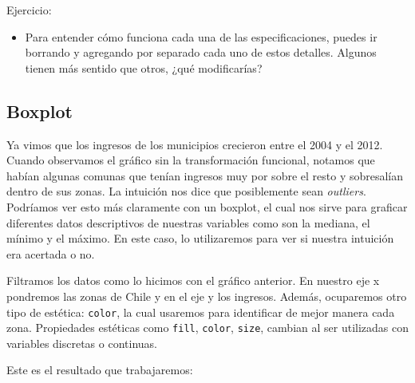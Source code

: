 \documentclass[]{book}
\newenvironment{Shaded}{\begin{snugshade}}{\end{snugshade}}
\newcommand{\DataTypeTok}[1]{\textcolor[rgb]{0.13,0.29,0.53}{#1}}
\newcommand{\DecValTok}[1]{\textcolor[rgb]{0.00,0.00,0.81}{#1}}
\newcommand{\KeywordTok}[1]{\textcolor[rgb]{0.13,0.29,0.53}{\textbf{#1}}}
\newcommand{\NormalTok}[1]{#1}
\newcommand{\OperatorTok}[1]{\textcolor[rgb]{0.81,0.36,0.00}{\textbf{#1}}}
\newcommand{\StringTok}[1]{\textcolor[rgb]{0.31,0.60,0.02}{#1}}
\providecommand{\tightlist}{%
  \setlength{\itemsep}{0pt}\setlength{\parskip}{0pt}}
\begin{document}
Ejercicio:

\begin{itemize}
\tightlist
\item
  Para entender cómo funciona cada una de las especificaciones, puedes
  ir borrando y agregando por separado cada uno de estos detalles.
  Algunos tienen más sentido que otros, ¿qué modificarías?
\end{itemize}

\hypertarget{boxplot}{%
\subsection{Boxplot}\label{boxplot}}

Ya vimos que los ingresos de los municipios crecieron entre el 2004 y el
2012. Cuando observamos el gráfico sin la transformación funcional,
notamos que habían algunas comunas que tenían ingresos muy por sobre el
resto y sobresalían dentro de sus zonas. La intuición nos dice que
posiblemente sean \emph{outliers}. Podríamos ver esto más claramente con
un boxplot, el cual nos sirve para graficar diferentes datos
descriptivos de nuestras variables como son la mediana, el mínimo y el
máximo. En este caso, lo utilizaremos para ver si nuestra intuición era
acertada o no.

Filtramos los datos como lo hicimos con el gráfico anterior. En nuestro
eje x pondremos las zonas de Chile y en el eje y los ingresos. Además,
ocuparemos otro tipo de estética: \texttt{color}, la cual usaremos para
identificar de mejor manera cada zona. Propiedades estéticas como
\texttt{fill}, \texttt{color}, \texttt{size}, cambian al ser utilizadas
con variables discretas o continuas.

Este es el resultado que trabajaremos:

\begin{Shaded}
\end{Shaded}
\end{document}
